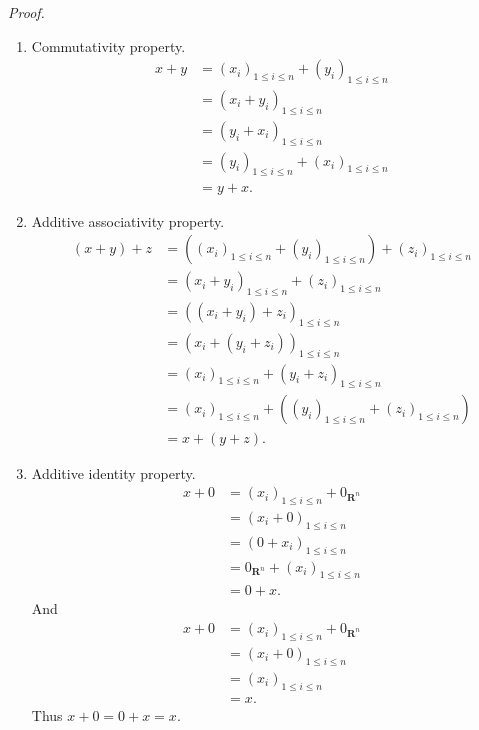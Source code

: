 \documentclass{book}
\newcommand{\pff}{\vspace{.25em}\noindent\emph{Proof.}~~}
\begin{document}
\pff
\begin{enumerate}
    \item Commutativity property.
        \begin{align*}
            x+y&=(x_i)_{1\leq i\leq n}+(y_i)_{1\leq i\leq n}\\
            &=(x_i+y_i)_{1\leq i\leq n}\\
            &=(y_i+x_i)_{1\leq i\leq n}\\
            &=(y_i)_{1\leq i\leq n}+(x_i)_{1\leq i\leq n}\\
            &=y+x.
        \end{align*}

    \item Additive associativity property.
        \begin{align*}
            (x+y)+z&=((x_i)_{1\leq i\leq n}+(y_i)_{1\leq i\leq n})+(z_i)_{1\leq i\leq n}\\
            &=(x_i+y_i)_{1\leq i\leq n}+(z_i)_{1\leq i\leq n}\\
            &=((x_i+y_i)+z_i)_{1\leq i\leq n}\\
            &=(x_i+(y_i+z_i))_{1\leq i\leq n}\\
            &=(x_i)_{1\leq i\leq n}+(y_i+z_i)_{1\leq i\leq n}\\
            &=(x_i)_{1\leq i\leq n}+((y_i)_{1\leq i\leq n}+(z_i)_{1\leq i\leq n})\\
            &=x+(y+z).
        \end{align*}

    \item Additive identity property.
        \begin{align*}
            x+0&=(x_i)_{1\leq i\leq n}+0_{\mathbf{R}^n}\\
            &=(x_i+0)_{1\leq i\leq n}\\
            &=(0+x_i)_{1\leq i\leq n}\\
            &=0_{\mathbf{R}^n}+(x_i)_{1\leq i\leq n}\\
            &=0+x.
        \end{align*}
    And
        \begin{align*}
            x+0&=(x_i)_{1\leq i\leq n}+0_{\mathbf{R}^n}\\
            &=(x_i+0)_{1\leq i\leq n}\\
            &=(x_i)_{1\leq i\leq n}\\
            &=x.
        \end{align*}
    Thus $x+0=0+x=x$.


\end{enumerate}
\end{document}
